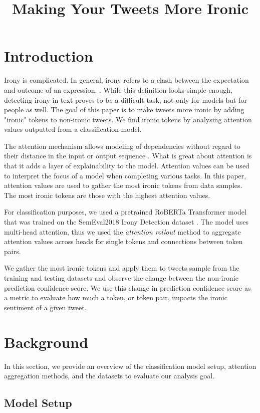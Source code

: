 \documentclass[10pt, a4paper]{article}
\title{Making Your Tweets More Ironic}
\begin{document}
\maketitleabstract

\section{Introduction}

Irony is complicated.
In general, irony refers to a clash between the expectation and outcome of an expression. \citep{kreutz-20}. 
While this definition looks simple enough, detecting irony in text proves to be a difficult task, not only for models but for people as well.
The goal of this paper is to make tweets more ironic by adding "ironic" tokens to non-ironic tweets.
We find ironic tokens by analysing attention values outputted from a classification model.

The attention mechanism allows modeling of dependencies without regard to their distance in the input or output sequence \citep{all-you-need}.
What is great about attention is that it adds a layer of explainability to the model. Attention values can be used to interpret the focus of a model when completing various tasks.
In this paper, attention values are used to gather the most ironic tokens from data samples. The most ironic tokens are those with the highest attention values.

For classification purposes, we used a pretrained RoBERTa Transformer model that was trained on the SemEval2018 Irony Detection dataset \citep{roberta}.
The model uses multi-head attention, thus we used the \textit{attention rollout} method to aggregate attention values across heads for single tokens and connections between token pairs.

We gather the most ironic tokens and apply them to tweets sample from the training and testing datasets and observe the change between the non-ironic prediction confidence score.
We use this change in prediction confidence score as a metric to evaluate how much a token, or token pair, impacts the ironic sentiment of a given tweet.

\section{Background}

In this section, we provide an overview of the classification model setup, attention aggregation methods, and the datasets to evaluate our analysis goal.

\subsection{Model Setup}
\label{sec:first}
\end{document}
